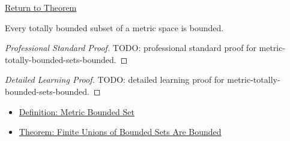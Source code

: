 \newpage
{}
\label{prf:metric-totally-bounded-sets-bounded}

\begin{remark*}[Return]
\hyperref[thm:metric-totally-bounded-sets-bounded]{Return to Theorem}
\end{remark*}

\begin{theorem*}
Every totally bounded subset of a metric space is bounded.
\end{theorem*}

\begin{proof}[Professional Standard Proof]
\LRAProofBodyStart
TODO: professional standard proof for metric-totally-bounded-sets-bounded.
\end{proof}

\begin{proof}[Detailed Learning Proof]
\LRAProofBodyStart
TODO: detailed learning proof for metric-totally-bounded-sets-bounded.
\end{proof}

\begin{remark*}
\end{remark*}

\begin{dependencies}
\begin{itemize}
  \item \hyperref[def:metric-bounded-set]{Definition: Metric Bounded Set}
  \item \hyperref[thm:metric-finite-unions-bounded-sets-bounded]{Theorem: Finite Unions of Bounded Sets Are Bounded}
\end{itemize}
\end{dependencies}

\clearpage
